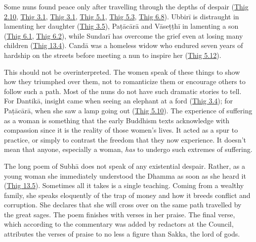\documentclass[12pt,openany]{book}%
\begin{document}
Some nuns found peace only after travelling through the depths of despair (\href{https://suttacentral.net/thig2.10}{Thig 2.10}, \href{https://suttacentral.net/thig3.1}{Thig 3.1}, \href{https://suttacentral.net/thig3.1}{Thig 3.1}, \href{https://suttacentral.net/thig5.1}{Thig 5.1}, \href{https://suttacentral.net/thig5.3}{Thig 5.3}, \href{https://suttacentral.net/thig6.8}{Thig 6.8}). \textsanskrit{Ubbirī} is distraught in lamenting her daughter (\href{https://suttacentral.net/thig3.5}{Thig 3.5}), \textsanskrit{Paṭācārā} and \textsanskrit{Vāseṭṭhī} in lamenting a son (\href{https://suttacentral.net/thig6.1}{Thig 6.1}, \href{https://suttacentral.net/thig6.2}{Thig 6.2}), while \textsanskrit{Sundarī} has overcome the grief even at losing many children (\href{https://suttacentral.net/thig13.4}{Thig 13.4}). \textsanskrit{Candā} was a homeless widow who endured seven years of hardship on the streets before meeting a nun to inspire her (\href{https://suttacentral.net/thig5.12}{Thig 5.12}).

This should not be overinterpreted. The women speak of these things to show how they triumphed over them, not to romanticize them or encourage others to follow such a path. Most of the nuns do not have such dramatic stories to tell. For \textsanskrit{Dantikā}, insight came when seeing an elephant at a ford (\href{https://suttacentral.net/thig3.4}{Thig 3.4}); for \textsanskrit{Paṭācārā}, when she saw a lamp going out (\href{https://suttacentral.net/thig5.10}{Thig 5.10}). The experience of suffering as a woman is something that the early Buddhism texts acknowledge with compassion since it is the reality of those women’s lives. It acted as a spur to practice, or simply to contrast the freedom that they now experience. It doesn’t mean that anyone, especially a woman, \emph{has} to undergo such extremes of suffering.

The long poem of \textsanskrit{Subhā} does not speak of any existential despair. Rather, as a young woman she immediately understood the Dhamma as soon as she heard it (\href{https://suttacentral.net/thig13.5}{Thig 13.5}). Sometimes all it takes is a single teaching. Coming from a wealthy family, she speaks eloquently of the trap of money and how it breeds conflict and corruption. She declares that she will cross over on the same path travelled by the great sages. The poem finishes with verses in her praise. The final verse, which according to the commentary was added by redactors at the Council, attributes the verses of praise to no less a figure than Sakka, the lord of gods.
\end{document}
